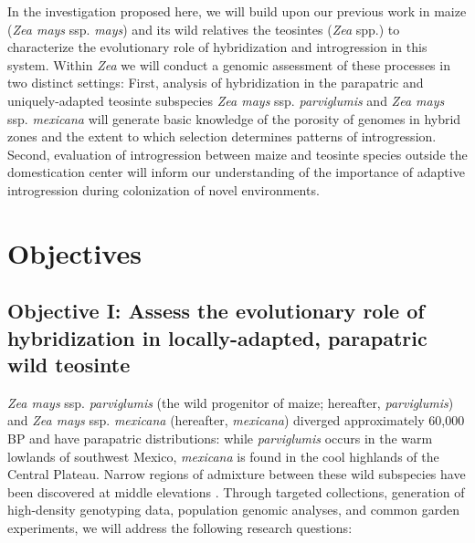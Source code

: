 In the investigation proposed here, we will build upon our previous work in maize (\emph{Zea mays} ssp. \emph{mays}) and its wild relatives the teosintes (\emph{Zea} spp.) to characterize the evolutionary role of hybridization and introgression in this system. 
Within \emph{Zea} we will conduct a genomic assessment of these processes in two distinct settings:  
First, analysis of hybridization in the parapatric and uniquely-adapted teosinte subspecies \emph{Zea mays} ssp. \emph{parviglumis} and \emph{Zea mays} ssp. \emph{mexicana} will generate basic knowledge of the porosity of genomes in hybrid zones and the extent to which selection determines patterns of introgression.
Second, evaluation of introgression between maize and teosinte species outside the domestication center will inform our understanding of the importance of adaptive introgression during colonization of novel environments.   

\section*{Objectives}
	

\subsection*{Objective I: Assess the evolutionary role of hybridization in locally-adapted, parapatric wild teosinte}
\emph{Zea mays} ssp. \emph{parviglumis} (the wild progenitor of maize; hereafter, \emph{parviglumis}) and \emph{Zea mays} ssp. \emph{mexicana} (hereafter, \emph{mexicana}) diverged approximately 60,000 BP \citep{Ross-Ibarra2009a} and have parapatric distributions: while \emph{parviglumis} occurs in the warm lowlands of southwest Mexico, \emph{mexicana} is found in the cool highlands of the Central Plateau. Narrow regions of admixture between these wild subspecies have been discovered at middle elevations \citep{Fukunaga2005, Pyhajarvi2013}. 
Through targeted collections, generation of high-density genotyping data, population genomic analyses, and common garden experiments, we will address the following research questions: 

